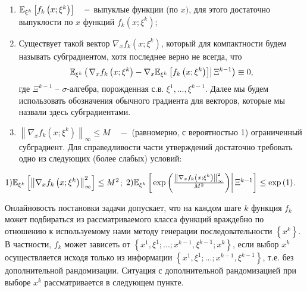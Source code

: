 \begin{enumerate}
\item $\mathrm{{\mathbb E}}_{\xi^k} \left[ {f_k \left( {x;\xi ^k} \right)} \right]\quad -$ выпуклые функции (по $x)$, для этого достаточно выпуклости по $x$ функций $f_k \left( {x;\xi ^k} \right)$;
\item Существует такой вектор $\nabla _x f_k \left( {x;\xi ^k} \right)$, который для компактности будем называть субградиентом, хотя последнее верно не всегда, что
\[
\mathrm{{\mathbb E}}_{\xi ^k} \left( {\left. {\nabla _x f_k \left( {x;\xi ^k} \right)-\nabla _x 
\mathrm{{\mathbb E}}_{\xi ^k} \left[ {f_k \left( {x;\xi ^k} \right)} \right]} \right|\Xi 
^{k-1}} \right)\equiv 0,
\]
где $\Xi ^{k-1}$ -- $\sigma $-алгебра, порожденная с.в. 
$\xi ^1, \ldots ,\xi ^{k-1}$. Далее мы будем использовать 
обозначения обычного градиента для векторов, которые мы назвали здесь 
субградиентами. 

\item $\left\| {\nabla _x f_k \left( {x;\xi ^k} \right)} \right\|_\infty \le M\quad -$ (равномерно, с вероятностью 1) ограниченный субградиент. Для справедливости части утверждений достаточно требовать одно из следующих (более слабых) условий:
\end{enumerate}
\begin{center}
 $1) \mathrm{{\mathbb E}}_{\xi ^k} \left[ {\left\| {\nabla _x f_k \left( {x;\xi ^k} \right)} 
\right\|_\infty ^2 } \right]\le M^2$; $2) \mathrm{{\mathbb E}}_{\xi ^k} \left[ {\left. {\exp 
\left( {\frac{\left\| {\nabla _x f_k \left( {x;\xi ^k} \right)} 
\right\|_\infty ^2 }{M^2}} \right)} \right|\Xi ^{k-1}} \right]\le \exp 
\left( 1 \right)$.
\end{center}

Онлайновость постановки задачи допускает, что на каждом шаге $k$ функция 
$f_k $ может подбираться из рассматриваемого класса функций враждебно по 
отношению к используемому нами методу генерации последовательности $\left\{ 
{x^k} \right\}$. В частности, $f_k $ может зависеть от $\left\{ {x^1,\xi 
^1;...;x^{k-1},\xi ^{k-1};x^k} \right\}$, если выбор $x^k$ осуществляется 
исходя только из информации $\left\{ {x^1,\xi ^1;...;x^{k-1},\xi ^{k-1}} 
\right\}$, т.е. без дополнительной рандомизации. Ситуация с дополнительной 
рандомизацией при выборе $x^k$ рассматривается в следующем пункте.

